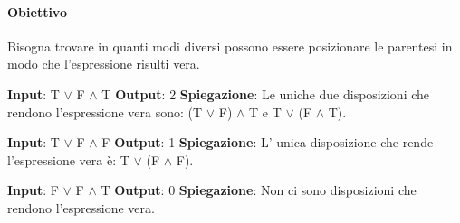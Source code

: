     \paragraph{Obiettivo} Bisogna trovare in quanti modi diversi possono essere posizionare le parentesi in modo che l'espressione risulti vera.
    \begin{esempio}
        \newline
        \textbf{Input}: T $\vee$ F $\wedge$ T
        \newline
        \textbf{Output}: 2
        \newline
        \textbf{Spiegazione}: Le uniche due disposizioni che rendono l'espressione vera sono: (T $\vee$ F) $\wedge$ T e T $\vee$ (F $\wedge$ T).
    \end{esempio}
    \begin{esempio}
        \newline
        \textbf{Input}: T $\vee$ F $\wedge$ F
        \newline
        \textbf{Output}: 1
        \newline
        \textbf{Spiegazione}: L' unica disposizione che rende l'espressione vera è: T $\vee$ (F $\wedge$ F).
    \end{esempio}
    \begin{esempio}
        \newline
        \textbf{Input}: F $\vee$ F $\wedge$ T
        \newline
        \textbf{Output}: 0
        \newline
        \textbf{Spiegazione}: Non ci sono disposizioni che rendono l'espressione vera.
    \end{esempio}